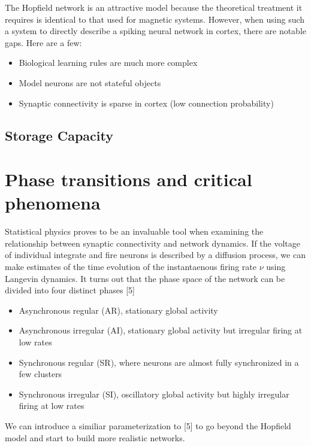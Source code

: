 \documentclass{article} %
\begin{document}
The Hopfield network is an attractive model because the theoretical treatment it requires is identical to that used for magnetic systems. However, when using such a system to directly describe a spiking neural network in cortex, there are notable gaps. Here are a few:

\begin{itemize}
  \item Biological learning rules are much more complex
  \item Model neurons are not stateful objects
  \item Synaptic connectivity is sparse in cortex (low connection probability)
\end{itemize}


\subsection{Storage Capacity}




\section{Phase transitions and critical phenomena}

Statistical physics proves to be an invaluable tool when examining the relationship between synaptic connectivity and network dynamics. If the voltage of individual integrate and fire neurons is described by a diffusion process, we can make estimates of the time evolution of the instantaenous firing rate $\nu$ using Langevin dynamics. It turns out that the phase space of the network can be divided into four distinct phases [5]

\begin{itemize}
  \item Asynchronous regular (AR), stationary global activity
  \item Asynchronous irregular (AI), stationary global activity but irregular firing at low rates
  \item Synchronous regular (SR), where neurons are almost fully synchronized in a few clusters
  \item Synchronous irregular (SI), oscillatory global activity but highly irregular firing at low rates
\end{itemize}

We can introduce a similiar parameterization to [5] to go beyond the Hopfield model and start to build more realistic networks. 
\end{document}
